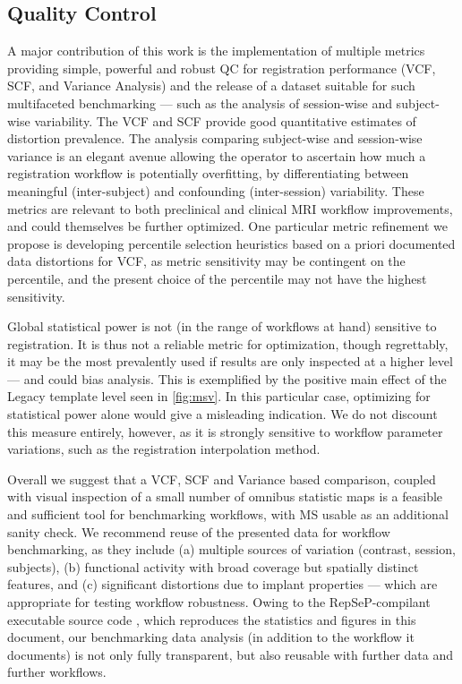 \subsection{Quality Control}

A major contribution of this work is the implementation of multiple metrics providing simple, powerful and robust QC for registration performance (VCF, SCF, and Variance Analysis) and the release of a dataset \cite{irsabi_bidsdata} suitable for such multifaceted benchmarking --- such as the analysis of session-wise and subject-wise variability.
The VCF and SCF provide good quantitative estimates of distortion prevalence.
The analysis comparing subject-wise and session-wise variance is an elegant avenue allowing the operator to ascertain how much a registration workflow is potentially overfitting, by differentiating between meaningful (inter-subject) and confounding (inter-session) variability.
These metrics are relevant to both preclinical and clinical MRI workflow improvements, and could themselves be further optimized.
One particular metric refinement we propose is developing percentile selection heuristics based on a priori documented data distortions for VCF, as metric sensitivity may be contingent on the percentile, and the present choice of the  percentile may not have the highest sensitivity.

Global statistical power is not (in the range of workflows at hand) sensitive to registration.
It is thus not a reliable metric for optimization, though regrettably, it may be the most prevalently used if results are only inspected at a higher level --- and could bias analysis.
This is exemplified by the positive main effect of the Legacy template level seen in \cref{fig:msv}.
In this particular case, optimizing for statistical power alone would give a misleading indication.
We do not discount this measure entirely, however, as it is strongly sensitive to workflow parameter variations, such as the registration interpolation method.

Overall we suggest that a VCF, SCF and Variance based comparison, coupled with visual inspection of a small number of omnibus statistic maps is a feasible and sufficient tool for benchmarking workflows, with MS usable as an additional sanity check.
We recommend reuse of the presented data for workflow benchmarking, as they include (a) multiple sources of variation (contrast, session, subjects), (b) functional activity with broad coverage but spatially distinct features, and (c) significant distortions due to implant properties --- which are appropriate for testing workflow robustness.
Owing to the RepSeP-compilant executable source code \cite{source}, which reproduces the statistics and figures in this document, our benchmarking data analysis (in addition to the workflow it documents) is not only fully transparent, but also reusable with further data and further workflows.

